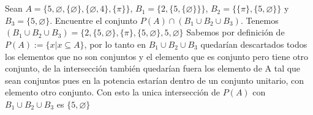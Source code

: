 \section{}
Sean $A = \{5, \varnothing, \{\varnothing\}, \{\varnothing,4\}, \{\pi\}\}$, $B_1 = \{ 2, \{5, \{\varnothing\}\}\}$, $B_2 = \{ \{\pi\}, \{5, \varnothing\} \}$ y $B_3 = \{5, \varnothing\}$. Encuentre el conjunto $P(A) \cap (B_1 \cup B_2 \cup B_3)$.\newline
Tenemos $(B_1 \cup B_2 \cup B_3) = \{2, \{5, \varnothing\}, \{ \pi\} , \{5 , \varnothing\} , 5, \varnothing\}$\newline
Sabemos por definición de $P(A) := \{ x | x \subseteq A\}$, por lo tanto en $B_1 \cup B_2 \cup B_3$ quedarían descartados todos los elementos que no son conjuntos y el elemento que es conjunto pero tiene otro conjunto, de la intersección también quedarían fuera los elemento de A tal que sean conjuntos pues en la potencia estarían dentro de un conjunto unitario, con elemento otro conjunto. \newline
Con esto la unica intersección de $P(A)$ con $B_1 \cup B_2 \cup B_3$ es $\{5, \varnothing \}$